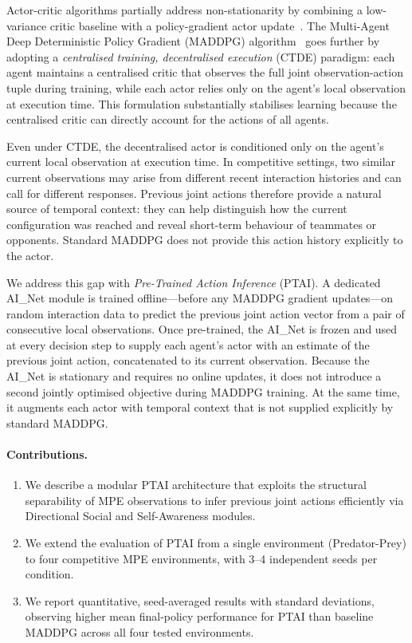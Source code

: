 \documentclass[12pt]{article}
\begin{document}
Actor-critic algorithms partially address non-stationarity by combining a low-variance
critic baseline with a policy-gradient actor update~\cite{mnih2016asynchronous}. The
Multi-Agent Deep Deterministic Policy Gradient (MADDPG) algorithm~\cite{lowe2017multi}
goes further by adopting a \emph{centralised training, decentralised execution} (CTDE)
paradigm: each agent maintains a centralised critic that observes the full joint
observation-action tuple during training, while each actor relies only on the agent's
local observation at execution time. This formulation substantially stabilises learning
because the centralised critic can directly account for the actions of all agents.

Even under CTDE, the decentralised actor is conditioned only on the agent's current local
observation at execution time. In competitive settings, two similar current observations
may arise from different recent interaction histories and can call for different responses.
Previous joint actions therefore provide a natural source of temporal context: they can
help distinguish how the current configuration was reached and reveal short-term behaviour
of teammates or opponents. Standard MADDPG does not provide this action history explicitly
to the actor.

We address this gap with \emph{Pre-Trained Action Inference} (PTAI). A dedicated AI\_Net
module is trained offline---before any MADDPG gradient updates---on random interaction
data to predict the previous joint action vector from a pair of consecutive local
observations. Once pre-trained, the AI\_Net is frozen and used at every decision step to
supply each agent's actor with an estimate of the previous joint action, concatenated to
its current observation. Because the AI\_Net is stationary and requires no online updates, it does not introduce
a second jointly optimised objective during MADDPG training. At the same time, it augments
each actor with temporal context that is not supplied explicitly by standard MADDPG.

\paragraph{Contributions.}
\begin{enumerate}
\item We describe a modular PTAI architecture that exploits the structural separability of
      MPE observations to infer previous joint actions efficiently via Directional Social
      and Self-Awareness modules.
\item We extend the evaluation of PTAI from a single environment (Predator-Prey) to four
      competitive MPE environments, with 3--4 independent seeds per condition.
\item We report quantitative, seed-averaged results with standard deviations, observing
      higher mean final-policy performance for PTAI than baseline MADDPG across all four
      tested environments.
\end{enumerate}
\end{document}
